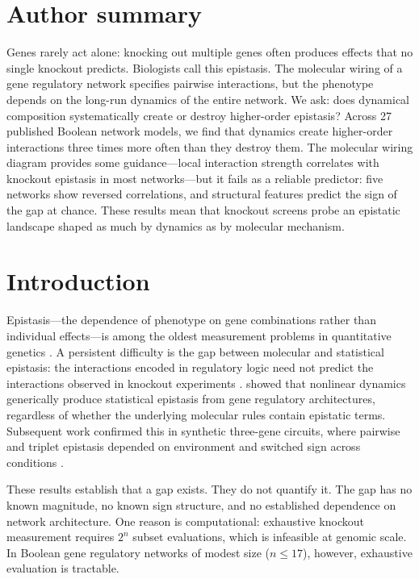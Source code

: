\documentclass[10pt]{article}
\begin{document}
\section*{Author summary}
Genes rarely act alone: knocking out multiple genes often produces
effects that no single knockout predicts. Biologists call this epistasis.
The molecular wiring of a gene regulatory network specifies pairwise
interactions, but the phenotype depends on the long-run dynamics of the
entire network. We ask: does dynamical composition systematically create
or destroy higher-order epistasis? Across 27 published Boolean network
models, we find that dynamics create higher-order interactions three
times more often than they destroy them. The molecular wiring diagram
provides some guidance---local interaction strength correlates with
knockout epistasis in most networks---but it fails as a reliable
predictor: five networks show reversed correlations, and structural
features predict the sign of the gap at chance. These results mean
that knockout screens probe an epistatic landscape shaped as much by
dynamics as by molecular mechanism.


\section{Introduction}
\label{sec:intro}

Epistasis---the dependence of phenotype on gene combinations rather
than individual effects---is among the oldest measurement problems in
quantitative genetics \citep{fisher1918correlation, bateson1909heredity}. A
persistent difficulty is the gap between molecular and statistical
epistasis: the interactions encoded in regulatory logic need not
predict the interactions observed in knockout experiments
\citep{phillips2008epistasis}. \citet{gjuvsland2007statistical} showed
that nonlinear dynamics generically produce statistical epistasis from
gene regulatory architectures, regardless of whether the underlying
molecular rules contain epistatic terms. Subsequent work confirmed this in synthetic three-gene
circuits, where pairwise and triplet epistasis depended on environment
and switched sign across conditions \citep{baier2023environment}.

These results establish that a gap exists. They do not quantify it.
The gap has no known magnitude, no known sign structure, and no
established dependence on network architecture. One reason is
computational: exhaustive knockout measurement requires $2^n$ subset
evaluations, which is infeasible at genomic scale. In Boolean gene
regulatory networks of modest size ($n \leq 17$), however, exhaustive
evaluation is tractable.
\end{document}
